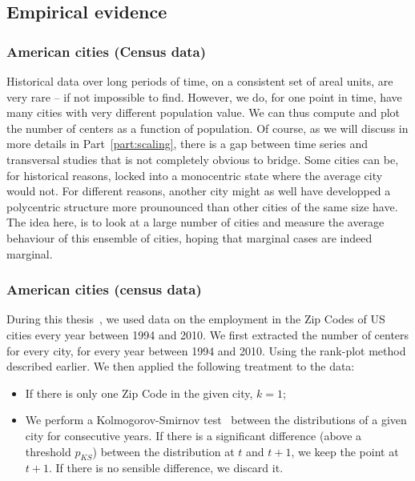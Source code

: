 \subsection{Empirical evidence}
\label{sub:empirical_evidence}

\subsubsection{American cities (Census data)}
\label{ssub:american_cities_census_data_}



Historical data over long periods of time, on a consistent set of areal units,
are very rare -- if not impossible to find. However, we do, for one point in
time, have many cities with very different population value. We can thus compute
and plot the number of centers as a function of population. Of course, as we
will discuss in more details in Part~\ref{part:scaling}, there is a gap between
time series and transversal studies that is not completely obvious to
bridge.  Some cities can be, for historical reasons, locked into a monocentric
state where the average city would not. For different reasons, another city
might as well have developped a polycentric structure more prounounced than
other cities of the same size have. The idea here, is to look at a large number
of cities and measure the average behaviour of this ensemble of cities, hoping
that marginal cases are indeed marginal.


\subsubsection{American cities (census data)}
\label{ssub:american_cities_census_data_}

During this thesis~\cite{Louf:2013_polycentric}, we used data on the employment in the Zip Codes of US cities
every year between 1994 and 2010. We first extracted the number of
centers for every city, for every year between 1994 and 2010. Using the
rank-plot method described earlier. We then applied the following treatment to
the data:

\begin{itemize}
    \item If there is only one Zip Code in the given city, $k=1$;
    \item We perform a Kolmogorov-Smirnov test~\cite{Massey:1951} between the
        distributions of a given city for consecutive years. If there is a
        significant difference (above a threshold $p_{KS}$) between the
        distribution at $t$ and $t+1$, we keep the point at $t+1$. If there is
        no sensible difference, we discard it.
\end{itemize}

